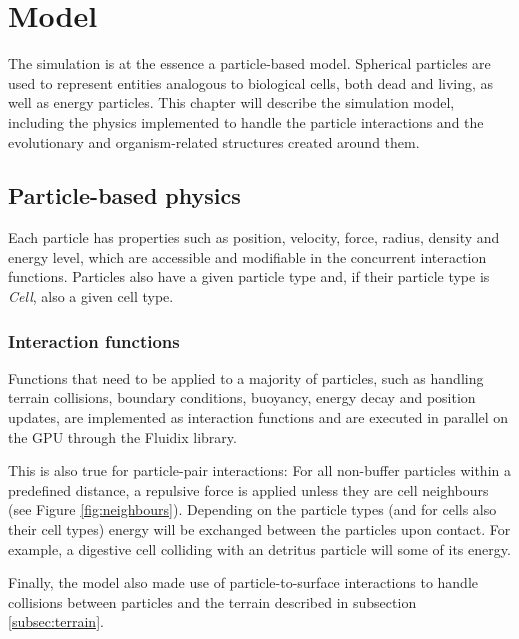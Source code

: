 \chapter{Model}
The simulation is at the essence a particle-based model. Spherical particles are used to represent entities analogous to biological cells, both dead and living, as well as energy particles. This chapter will describe the simulation model, including the physics implemented to handle the particle interactions and the evolutionary and organism-related structures created around them.


\section{Particle-based physics}
Each particle has properties such as position, velocity, force, radius, density and energy level, which are accessible and modifiable in the concurrent interaction functions. Particles also have a given particle type and, if their particle type is \emph{Cell}, also a given cell type.

\subsection{Interaction functions}
Functions that need to be applied to a majority of particles, such as handling terrain collisions, boundary conditions, buoyancy, energy decay and position updates, are implemented as interaction functions and are executed in parallel on the GPU through the Fluidix library.

This is also true for particle-pair interactions: For all non-buffer particles within a predefined distance, a repulsive force is applied unless they are cell neighbours (see Figure \ref{fig:neighbours}). Depending on the particle types (and for cells also their cell types) energy will be exchanged between the particles upon contact. For example, a digestive cell colliding with an detritus particle will some of its energy.

Finally, the model also made use of particle-to-surface interactions to handle collisions between particles and the terrain described in subsection \ref{subsec:terrain}. 

